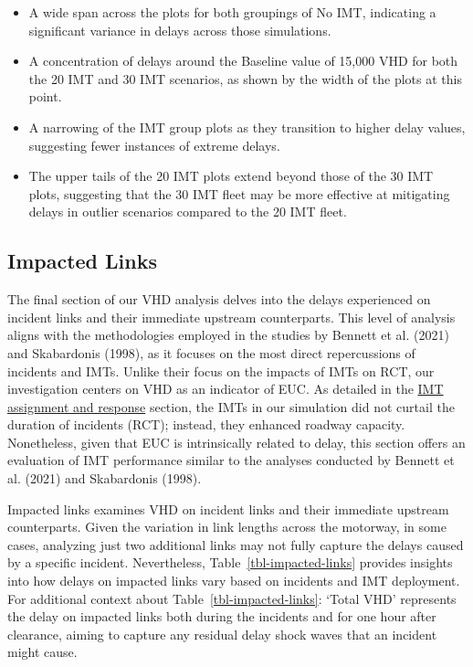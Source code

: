 \documentclass[fancy, oneside, mastersfancy, ms]{byuthesis}
\providecommand{\tightlist}{%
  \setlength{\itemsep}{0pt}\setlength{\parskip}{0pt}}\usepackage{longtable,booktabs,array}
\begin{document}
\begin{itemize}
\tightlist
\item
  A wide span across the plots for both groupings of No IMT, indicating
  a significant variance in delays across those simulations.
\item
  A concentration of delays around the Baseline value of 15,000 VHD for
  both the 20 IMT and 30 IMT scenarios, as shown by the width of the
  plots at this point.
\item
  A narrowing of the IMT group plots as they transition to higher delay
  values, suggesting fewer instances of extreme delays.
\item
  The upper tails of the 20 IMT plots extend beyond those of the 30 IMT
  plots, suggesting that the 30 IMT fleet may be more effective at
  mitigating delays in outlier scenarios compared to the 20 IMT fleet.
\end{itemize}

\hypertarget{sec-impacted}{%
\subsection{Impacted Links}\label{sec-impacted}}

The final section of our VHD analysis delves into the delays experienced
on incident links and their immediate upstream counterparts. This level
of analysis aligns with the methodologies employed in the studies by
Bennett et al. (2021) and Skabardonis (1998), as it focuses on the most
direct repercussions of incidents and IMTs. Unlike their focus on the
impacts of IMTs on RCT, our investigation centers on VHD as an indicator
of EUC. As detailed in the \protect\hyperlink{sec-imt_response}{IMT
assignment and response} section, the IMTs in our simulation did not
curtail the duration of incidents (RCT); instead, they enhanced roadway
capacity. Nonetheless, given that EUC is intrinsically related to delay,
this section offers an evaluation of IMT performance similar to the
analyses conducted by Bennett et al. (2021) and Skabardonis (1998).

Impacted links examines VHD on incident links and their immediate
upstream counterparts. Given the variation in link lengths across the
motorway, in some cases, analyzing just two additional links may not
fully capture the delays caused by a specific incident. Nevertheless,
Table~\ref{tbl-impacted-links} provides insights into how delays on
impacted links vary based on incidents and IMT deployment. For
additional context about Table~\ref{tbl-impacted-links}: `Total VHD'
represents the delay on impacted links both during the incidents and for
one hour after clearance, aiming to capture any residual delay shock
waves that an incident might cause.
\end{document}
